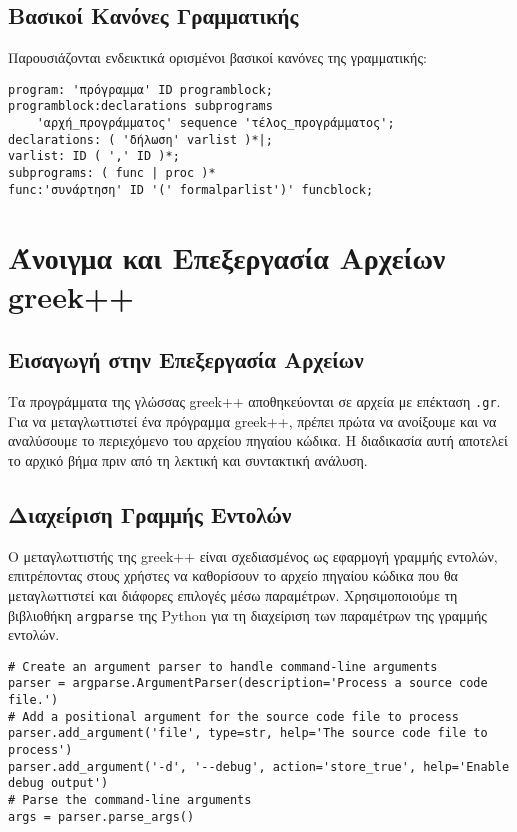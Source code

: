 \documentclass[12pt,a4paper]{article}
\begin{document}
\subsection{Βασικοί Κανόνες Γραμματικής}
Παρουσιάζονται ενδεικτικά ορισμένοι βασικοί κανόνες της γραμματικής:

\begin{verbatim}
program: 'πρόγραμμα' ID programblock;
programblock:declarations subprograms
    'αρχή_προγράμματος' sequence 'τέλος_προγράμματος';
declarations: ( 'δήλωση' varlist )*|;
varlist: ID ( ',' ID )*;
subprograms: ( func | proc )*
func:'συνάρτηση' ID '(' formalparlist')' funcblock;
\end{verbatim}

\section{Άνοιγμα και Επεξεργασία Αρχείων greek++}

\subsection{Εισαγωγή στην Επεξεργασία Αρχείων}
Τα προγράμματα της γλώσσας greek++ αποθηκεύονται σε αρχεία με επέκταση \texttt{.gr}. Για να μεταγλωττιστεί ένα πρόγραμμα greek++, πρέπει πρώτα να ανοίξουμε και να αναλύσουμε το περιεχόμενο του αρχείου πηγαίου κώδικα. Η διαδικασία αυτή αποτελεί το αρχικό βήμα πριν από τη λεκτική και συντακτική ανάλυση.

\subsection{Διαχείριση Γραμμής Εντολών}

Ο μεταγλωττιστής της greek++ είναι σχεδιασμένος ως εφαρμογή γραμμής εντολών, επιτρέποντας στους χρήστες να καθορίσουν το αρχείο πηγαίου κώδικα που θα μεταγλωττιστεί και διάφορες επιλογές μέσω παραμέτρων. Χρησιμοποιούμε τη βιβλιοθήκη \texttt{argparse} της Python για τη διαχείριση των παραμέτρων της γραμμής εντολών.

\begin{verbatim}
# Create an argument parser to handle command-line arguments
parser = argparse.ArgumentParser(description='Process a source code file.')
# Add a positional argument for the source code file to process
parser.add_argument('file', type=str, help='The source code file to process')
parser.add_argument('-d', '--debug', action='store_true', help='Enable debug output')
# Parse the command-line arguments
args = parser.parse_args()
\end{verbatim}
\end{document}
